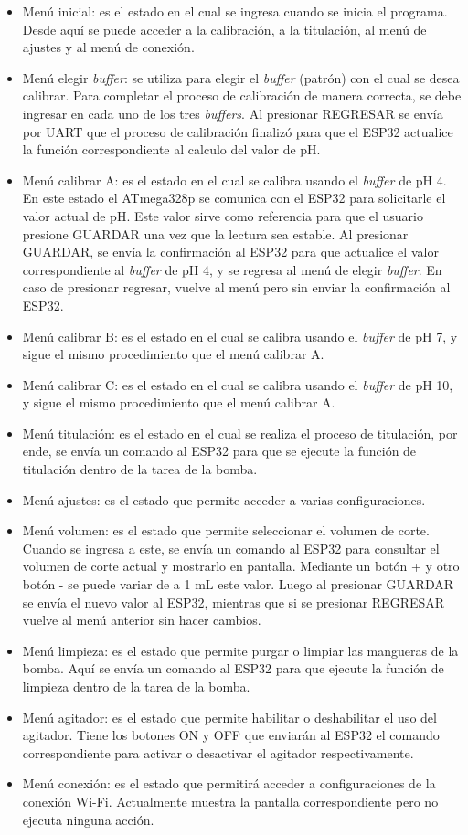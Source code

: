 \begin{itemize}
\item Menú inicial: es el estado en el cual se ingresa cuando se inicia el programa. Desde aquí se puede acceder a la calibración, a la titulación, al menú de ajustes y al menú de conexión.
\item Menú elegir \textit{buffer}: se utiliza para elegir el \textit{buffer} (patrón) con el cual se desea calibrar. Para completar el proceso de calibración de manera correcta, se debe ingresar en cada uno de los tres \textit{buffers}. Al presionar REGRESAR se envía por UART que el proceso de calibración finalizó para que el ESP32 actualice la función correspondiente al calculo del valor de pH.
\item Menú calibrar A: es el estado en el cual se calibra usando el \textit{buffer} de pH 4. En este estado el ATmega328p se comunica con el ESP32 para solicitarle el valor actual de pH. Este valor sirve como referencia para que el usuario presione GUARDAR una vez que la lectura sea estable. Al presionar GUARDAR, se envía la confirmación al ESP32 para que actualice el valor correspondiente al \textit{buffer} de pH 4, y se regresa al menú de elegir \textit{buffer}. En caso de presionar regresar, vuelve al menú pero sin enviar la confirmación al ESP32.
\item Menú calibrar B: es el estado en el cual se calibra usando el \textit{buffer} de pH 7, y sigue el mismo procedimiento que el menú calibrar A.
\item Menú calibrar C: es el estado en el cual se calibra usando el \textit{buffer} de pH 10, y sigue el mismo procedimiento que el menú calibrar A.
\item Menú titulación: es el estado en el cual se realiza el proceso de titulación, por ende, se envía un comando al ESP32 para que se ejecute la función de titulación dentro de la tarea de la bomba.
\item Menú ajustes: es el estado que permite acceder a varias configuraciones.
\item Menú volumen: es el estado que permite seleccionar el volumen de corte. Cuando se ingresa a este, se envía un comando al ESP32 para consultar el volumen de corte actual y mostrarlo en pantalla. Mediante un botón + y otro botón - se puede variar de a 1 mL este valor. Luego al presionar GUARDAR se envía el nuevo valor al ESP32, mientras que si se presionar REGRESAR vuelve al menú anterior sin hacer cambios.
\item Menú limpieza: es el estado que permite purgar o limpiar las mangueras de la bomba.  Aquí se envía un comando al ESP32 para que ejecute la función de limpieza dentro de la tarea de la bomba.
\item Menú agitador: es el estado que permite habilitar o deshabilitar el uso del agitador. Tiene los botones ON y OFF que enviarán al ESP32 el comando correspondiente para activar o desactivar el agitador respectivamente.
\item Menú conexión: es el estado que permitirá acceder a configuraciones de la conexión Wi-Fi. Actualmente muestra la pantalla correspondiente pero no ejecuta ninguna acción.
\end{itemize}

